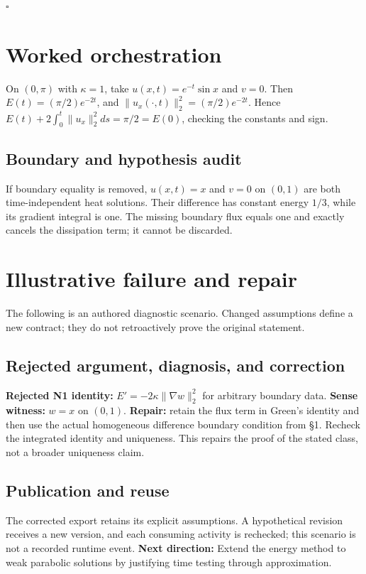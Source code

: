 \documentclass[preprint,12pt,aps,pra,showkeys,amsmath,amssymb,superscriptaddress,floatfix]{revtex4-2}
\theoremstyle{definition}
\theoremstyle{remark}
\begin{document}
\hfill$\square$

\section{Worked orchestration}

On \((0,\pi)\) with \(\kappa=1\), take \(u(x,t)=e^{-t}\sin x\) and
\(v=0\). Then \(E(t)=(\pi/2)e^{-2t}\), and
\(\|u_x(\cdot,t)\|_2^2=(\pi/2)e^{-2t}\). Hence
\(E(t)+2\int_0^t\|u_x\|_2^2ds=\pi/2=E(0)\), checking the constants and
sign.

\subsection{Boundary and hypothesis audit}

If boundary equality is removed, \(u(x,t)=x\) and \(v=0\) on \((0,1)\)
are both time-independent heat solutions. Their difference has constant
energy \(1/3\), while its gradient integral is one. The missing boundary
flux equals one and exactly cancels the dissipation term; it cannot be
discarded.

\section{Illustrative failure and repair}

The following is an authored diagnostic scenario. Changed assumptions
define a new contract; they do not retroactively prove the original
statement.

\subsection{Rejected argument, diagnosis, and correction}
\textbf{Rejected N1 identity:} \(E'=-2\kappa\|\nabla w\|_2^2\) for
arbitrary boundary data. \textbf{Sense witness:} \(w=x\) on \((0,1)\).
\textbf{Repair:} retain the flux term in Green's identity and then use
the actual homogeneous difference boundary condition from §1. Recheck
the integrated identity and uniqueness. This repairs the proof of the
stated class, not a broader uniqueness claim.

\subsection{Publication and reuse}
The corrected export retains its explicit assumptions. A hypothetical
revision receives a new version, and each consuming activity is
rechecked; this scenario is not a recorded runtime event. \textbf{Next
direction:} Extend the energy method to weak parabolic solutions by
justifying time testing through approximation.
\end{document}

